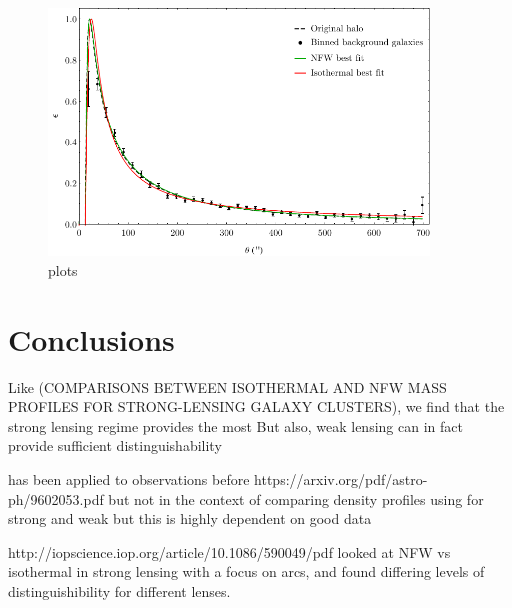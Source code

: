 \documentclass[10pt]{article}
\begin{document}


\begin{figure}
    \centering
    \includegraphics[width=0.9\textwidth]{comparison.pdf}
    \caption{plots}
    \label{}
\end{figure}



\section{Conclusions}

Like (COMPARISONS BETWEEN ISOTHERMAL AND NFW MASS PROFILES
FOR STRONG-LENSING GALAXY CLUSTERS), we find that the strong lensing regime provides the most
But also, weak lensing can in fact provide sufficient distinguishability

has been applied to observations before
https://arxiv.org/pdf/astro-ph/9602053.pdf
but not in the context of comparing density profiles using for strong and weak
but this is highly dependent on good data

http://iopscience.iop.org/article/10.1086/590049/pdf looked at NFW vs isothermal in strong lensing with a focus on arcs, and found differing levels of distinguishibility for different lenses.
\end{document}
